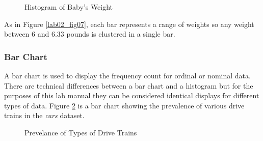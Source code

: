 \begin{figure}[H]
  \begin{center}
    \caption{Histogram of Baby's Weight}
    \label{lab02_fig08}
  \end{center}
\end{figure}

As in Figure \ref{lab02_fig07}, each bar represents a range of weights so any weight between $ 6 $ and $ 6.33 $ pounds is clustered in a single bar.

\subsubsection{Bar Chart} A bar chart is used to display the frequency count for ordinal or nominal data. There are technical differences between a bar chart and a histogram but for the purposes of this lab manual they can be considered identical displays for different types of data. Figure \ref{lab02_fig09} is a bar chart showing the prevalence of various drive trains in the \textit{cars} dataset.

\begin{figure}[H]
  \begin{center}
    \caption{Prevelance of Types of Drive Trains}
    \label{lab02_fig09}
  \end{center}
\end{figure}

